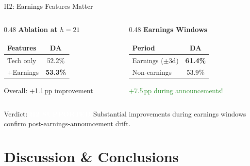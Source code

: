 \documentclass[aspectratio=169,xcolor={dvipsnames}]{beamer}
\begin{document}
\begin{frame}{H2: Earnings Features Matter}
  \begin{columns}[T]
    \begin{column}{0.48\textwidth}
      \textbf{Ablation at $h=21$}
      
      \small
      \begin{tabular}{lc}
        \toprule
        \textbf{Features} & \textbf{DA} \\
        \midrule
        Tech only & 52.2\% \\
        +Earnings & \textbf{53.3\%} \\
        \bottomrule
      \end{tabular}
      
      \vspace{0.3cm}
      
      Overall: +1.1\,pp improvement
    \end{column}
    
    \begin{column}{0.48\textwidth}
      \textbf{Earnings Windows}
      
      \small
      \begin{tabular}{lc}
        \toprule
        \textbf{Period} & \textbf{DA} \\
        \midrule
        Earnings ($\pm$3d) & \textbf{61.4\%} \\
        Non-earnings & 53.9\% \\
        \bottomrule
      \end{tabular}
      
      \vspace{0.3cm}
      
      \textcolor{ForestGreen}{+7.5\,pp during announcements!}
    \end{column}
  \end{columns}
  
  \vspace{0.3cm}
  
  \begin{alertblock}{Verdict: \textcolor{white}{\textbf{H2 SUPPORTED}}}
    \scriptsize
    Substantial improvements during earnings windows confirm post-earnings-announcement drift.
  \end{alertblock}
\end{frame}

\section{Discussion \& Conclusions}
\end{document}
